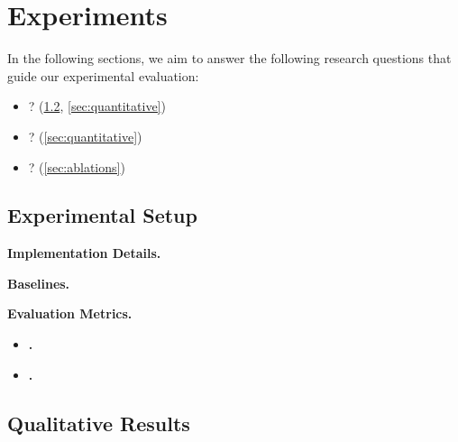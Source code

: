 \section{Experiments}
\label{sec:experiments}

In the following sections, we aim to answer the following research questions
that guide our experimental evaluation:
\begin{itemize}[leftmargin=1.4em,itemsep=1pt,topsep=2pt]
  \item {}?
    (\cref{sec:qualitative}, \cref{sec:quantitative})
  \item {}? (\cref{sec:quantitative})
  \item {}? (\cref{sec:ablations})
\end{itemize}

\subsection{Experimental Setup}
\label{sec:setup}

\textbf{Implementation Details.}

\textbf{Baselines.}

\textbf{Evaluation Metrics.}
\begin{itemize}[leftmargin=1.4em,itemsep=1pt,topsep=2pt]
  \item \textbf{.} 
  \item \textbf{.} 
\end{itemize}

\subsection{Qualitative Results}
\label{sec:qualitative}


